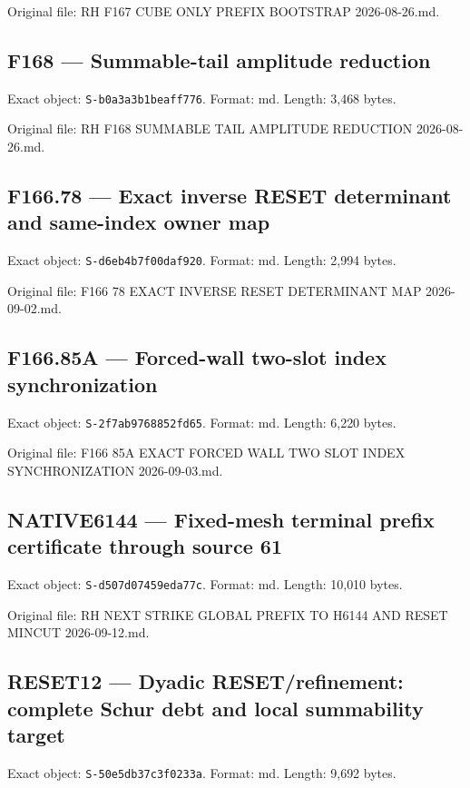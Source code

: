 \documentclass[
  10pt,
  a4paper,
  10pt,
  oneside,
  openany]{book}
\begin{document}
Original file: RH F167 CUBE ONLY PREFIX BOOTSTRAP 2026-08-26.md.

\subsection{F168 --- Summable-tail amplitude
reduction}\label{source-f168}

Exact object: \texttt{S-b0a3a3b1beaff776}. Format: md. Length: 3,468
bytes.

Original file: RH F168 SUMMABLE TAIL AMPLITUDE REDUCTION 2026-08-26.md.

\subsection{F166.78 --- Exact inverse RESET determinant and same-index
owner map}\label{source-f166-78}

Exact object: \texttt{S-d6eb4b7f00daf920}. Format: md. Length: 2,994
bytes.

Original file: F166 78 EXACT INVERSE RESET DETERMINANT MAP
2026-09-02.md.

\subsection{F166.85A --- Forced-wall two-slot index
synchronization}\label{source-f166-85a}

Exact object: \texttt{S-2f7ab9768852fd65}. Format: md. Length: 6,220
bytes.

Original file: F166 85A EXACT FORCED WALL TWO SLOT INDEX SYNCHRONIZATION
2026-09-03.md.

\subsection{NATIVE6144 --- Fixed-mesh terminal prefix certificate
through source 61}\label{source-native6144}

Exact object: \texttt{S-d507d07459eda77c}. Format: md. Length: 10,010
bytes.

Original file: RH NEXT STRIKE GLOBAL PREFIX TO H6144 AND RESET MINCUT
2026-09-12.md.

\subsection{RESET12 --- Dyadic RESET/refinement: complete Schur debt and
local summability target}\label{source-reset12}

Exact object: \texttt{S-50e5db37c3f0233a}. Format: md. Length: 9,692
bytes.
\end{document}
